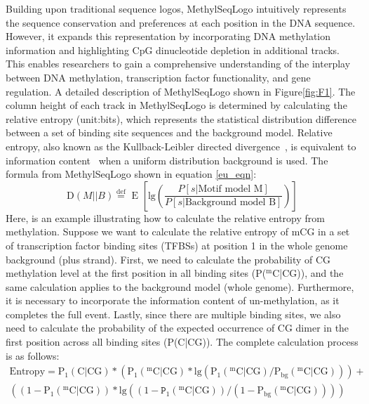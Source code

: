 \documentclass{PHlab-thesis}
\begin{document}
Building upon traditional sequence logos, MethylSeqLogo intuitively represents the sequence conservation and preferences at each position in the DNA sequence. However, it expands this representation by incorporating DNA methylation information and highlighting CpG dinucleotide depletion in additional tracks. This enables researchers to gain a comprehensive understanding of the interplay between DNA methylation, transcription factor functionality, and gene regulation.
A detailed description of MethylSeqLogo shown in Figure\ref{fig:F1}. The column height of each track in MethylSeqLogo is determined by calculating the relative entropy (unit:bits), which represents the statistical distribution difference between a set of binding site sequences and the background model. Relative entropy, also known as the Kullback-Leibler directed divergence~\cite{kullback1951information}, is equivalent to information content~\cite{Information1986} when a uniform distribution background is used. The formula from MethylSeqLogo shown in  equation \ref{eu_eqn}:
\begin{equation} \label{eu_eqn}
	\text{D}(M||B) \overset{\text{def}}{=} \text{ E }\left [ \text{lg}\left (\frac{P[s|\text{Motif model M}]}{P[s|\text{Background model B}]} \right) \right]
\end{equation}
Here, is an example illustrating how to calculate the relative entropy from methylation. Suppose we want to calculate the relative entropy of mCG in a set of transcription factor binding sites (TFBSs) at position 1 in the whole genome background (plus strand). First, we need to calculate the probability of CG methylation level at the first position in all binding sites (P($^{\text{m}}\text{C}$|CG)), and the same calculation applies to the background model (whole genome). Furthermore, it is necessary to incorporate the information content of un-methylation, as it completes the full event. Lastly, since there are multiple binding sites, we also need to calculate the probability of the expected occurrence of CG dimer in the first position across all binding sites (P(C|CG)). The complete calculation process is as follows:
\begin{multline*}
	\text{Entropy} = \text{P}_{1}(\text{C}|\text{CG})*(\text{P}_{1}(^{\text{m}}\text{C}|\text{CG})*\text{lg}(\text{P}_{1}(^{\text{m}}\text{C}|\text{CG})/\text{P}_{\text{bg}}(^{\text{m}}\text{C}|\text{CG})))+\\
((1-\text{P}_{1}(^{\text{m}}\text{C}|\text{CG}))*\text{lg}((1-\texttt{P}_{1}(^{\text{m}}\text{C}|\text{CG}))/(1-\text{P}_{\text{bg}}(^{\text{m}}\text{C}|\text{CG}))))
\end{multline*}
\end{document}
